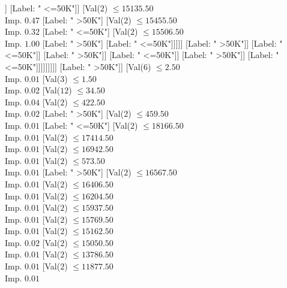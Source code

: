 \documentclass[margin=10pt]{standalone}
\begin{document}
\begin{forest}
																							[Label: " >50K"]]
																						[Label: " <=50K"]]
																					[Val($2$) $ \leq 15135.50$ \\ Imp. $0.47$
																						[Label: " >50K"]
																						[Val($2$) $ \leq 15455.50$ \\ Imp. $0.32$
																							[Label: " <=50K"]
																							[Val($2$) $ \leq 15506.50$ \\ Imp. $1.00$
																								[Label: " >50K"]
																								[Label: " <=50K"]]]]]
																				[Label: " >50K"]]
																			[Label: " <=50K"]]
																		[Label: " >50K"]]
																	[Label: " <=50K"]]
																[Label: " >50K"]]
															[Label: " <=50K"]]]]]]]]]
							[Label: " >50K"]]
						[Val($6$) $ \leq 2.50$ \\ Imp. $0.01$
							[Val($3$) $ \leq 1.50$ \\ Imp. $0.02$
								[Val($12$) $ \leq 34.50$ \\ Imp. $0.04$
									[Val($2$) $ \leq 422.50$ \\ Imp. $0.02$
										[Label: " >50K"]
										[Val($2$) $ \leq 459.50$ \\ Imp. $0.01$
											[Label: " <=50K"]
											[Val($2$) $ \leq 18166.50$ \\ Imp. $0.01$
												[Val($2$) $ \leq 17414.50$ \\ Imp. $0.01$
													[Val($2$) $ \leq 16942.50$ \\ Imp. $0.01$
														[Val($2$) $ \leq 573.50$ \\ Imp. $0.01$
															[Label: " >50K"]
															[Val($2$) $ \leq 16567.50$ \\ Imp. $0.01$
																[Val($2$) $ \leq 16406.50$ \\ Imp. $0.01$
																	[Val($2$) $ \leq 16204.50$ \\ Imp. $0.01$
																		[Val($2$) $ \leq 15937.50$ \\ Imp. $0.01$
																			[Val($2$) $ \leq 15769.50$ \\ Imp. $0.01$
																				[Val($2$) $ \leq 15162.50$ \\ Imp. $0.02$
																					[Val($2$) $ \leq 15050.50$ \\ Imp. $0.01$
																						[Val($2$) $ \leq 13786.50$ \\ Imp. $0.01$
																							[Val($2$) $ \leq 11877.50$ \\ Imp. $0.01$

\end{forest}
\end{document}
